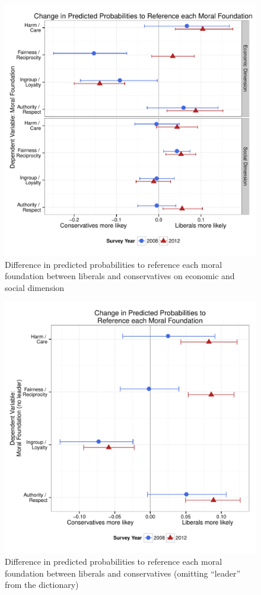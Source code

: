 \documentclass[12pt]{article}
\begin{document}
\begin{figure}[ht]\centering
\includegraphics[scale=.4]{../calc/fig/appD2soceco.pdf}
\caption{Difference in predicted probabilities to reference each moral foundation between liberals and conservatives on economic and social dimension}\label{fig:appD2soceco}
\end{figure}

\begin{figure}\centering
\includegraphics[scale=.4]{../calc/fig/appD3lead.pdf}
\caption{Difference in predicted probabilities to reference each moral foundation between liberals and conservatives (omitting ``leader'' from the dictionary)}\label{fig:appD3lead}
\end{figure}
\end{document}
